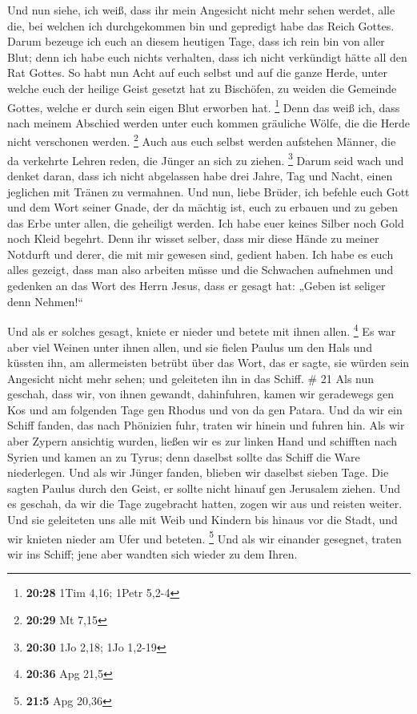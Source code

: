  Und nun siehe, ich weiß, dass ihr mein Angesicht nicht
mehr sehen werdet, alle die, bei welchen ich durchgekommen bin und
gepredigt habe das Reich Gottes.  Darum bezeuge ich euch an
diesem heutigen Tage, dass ich rein bin von aller Blut; 
denn ich habe euch nichts verhalten, dass ich nicht verkündigt hätte all
den Rat Gottes.  So habt nun Acht auf euch selbst und auf
die ganze Herde, unter welche euch der heilige Geist gesetzt hat zu
Bischöfen, zu weiden die Gemeinde Gottes, welche er durch sein eigen
Blut erworben hat. \footnote{\textbf{20:28} 1Tim 4,16; 1Petr 5,2-4}
 Denn das weiß ich, dass nach meinem Abschied werden unter
euch kommen gräuliche Wölfe, die die Herde nicht verschonen werden.
\footnote{\textbf{20:29} Mt 7,15}  Auch aus euch selbst
werden aufstehen Männer, die da verkehrte Lehren reden, die Jünger an
sich zu ziehen. \footnote{\textbf{20:30} 1Jo 2,18; 1Jo 1,2-19}
 Darum seid wach und denket daran, dass ich nicht
abgelassen habe drei Jahre, Tag und Nacht, einen jeglichen mit Tränen zu
vermahnen.  Und nun, liebe Brüder, ich befehle euch Gott
und dem Wort seiner Gnade, der da mächtig ist, euch zu erbauen und zu
geben das Erbe unter allen, die geheiligt werden.  Ich habe
euer keines Silber noch Gold noch Kleid begehrt.  Denn ihr
wisset selber, dass mir diese Hände zu meiner Notdurft und derer, die
mit mir gewesen sind, gedient haben.  Ich habe es euch
alles gezeigt, dass man also arbeiten müsse und die Schwachen aufnehmen
und gedenken an das Wort des Herrn Jesus, dass er gesagt hat: „Geben ist
seliger denn Nehmen!{}``

 Und als er solches gesagt, kniete er nieder und betete mit
ihnen allen. \footnote{\textbf{20:36} Apg 21,5}  Es war
aber viel Weinen unter ihnen allen, und sie fielen Paulus um den Hals
und küssten ihn,  am allermeisten betrübt über das Wort,
das er sagte, sie würden sein Angesicht nicht mehr sehen; und geleiteten
ihn in das Schiff. \# 21  Als nun geschah, dass wir, von
ihnen gewandt, dahinfuhren, kamen wir geradewegs gen Kos und am
folgenden Tage gen Rhodus und von da gen Patara.  Und da wir
ein Schiff fanden, das nach Phönizien fuhr, traten wir hinein und fuhren
hin.  Als wir aber Zypern ansichtig wurden, ließen wir es
zur linken Hand und schifften nach Syrien und kamen an zu Tyrus; denn
daselbst sollte das Schiff die Ware niederlegen.  Und als
wir Jünger fanden, blieben wir daselbst sieben Tage. Die sagten Paulus
durch den Geist, er sollte nicht hinauf gen Jerusalem ziehen.
 Und es geschah, da wir die Tage zugebracht hatten, zogen
wir aus und reisten weiter. Und sie geleiteten uns alle mit Weib und
Kindern bis hinaus vor die Stadt, und wir knieten nieder am Ufer und
beteten. \footnote{\textbf{21:5} Apg 20,36}  Und als wir
einander gesegnet, traten wir ins Schiff; jene aber wandten sich wieder
zu dem Ihren.

